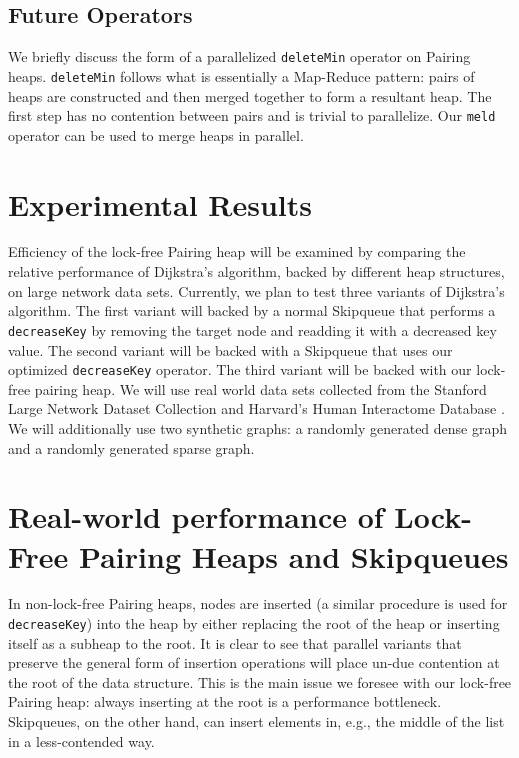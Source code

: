 \documentclass{acm_proc_article-sp}
\begin{document}
\subsection{Future Operators}
We briefly discuss the form of a parallelized \texttt{deleteMin} operator on Pairing heaps.
\texttt{deleteMin} follows what is essentially a Map-Reduce pattern: pairs of heaps are constructed
and then merged together to form a resultant heap. The first step has no contention between pairs
and is trivial to parallelize. Our \texttt{meld} operator can be used to merge heaps in parallel.

\section{Experimental Results}
Efficiency of the lock-free Pairing heap will be examined by comparing the relative performance of Dijkstra's algorithm, backed by different heap structures, on large network data sets. Currently, we
plan to test three variants of Dijkstra's algorithm. The first variant will backed by a normal Skipqueue that performs a \texttt{decreaseKey} by removing the target node and readding it with a decreased key value.
The second variant will be backed with a Skipqueue that uses our optimized \texttt{decreaseKey} operator. The third variant will be backed with our lock-free pairing heap. We
will use real world data sets collected from the Stanford Large Network Dataset Collection \cite{slndc} and Harvard's Human Interactome Database \cite{hid}. We will additionally use two
synthetic graphs: a randomly generated dense graph and a randomly generated sparse graph.


\section{Real-world performance of Lock-Free Pairing Heaps and Skipqueues}
In non-lock-free Pairing heaps, nodes are inserted (a similar procedure is used for \texttt{decreaseKey})
into the heap by either replacing the root of the heap or inserting itself as a subheap to the root. It is clear to see that
parallel variants that preserve the general form of insertion operations will place un-due contention at the
root of the data structure. This is the main issue we foresee with our lock-free Pairing heap: always inserting at the root
is a performance bottleneck. Skipqueues, on the other hand, can insert elements in, e.g., the middle of the list in a less-contended way.
\end{document}
